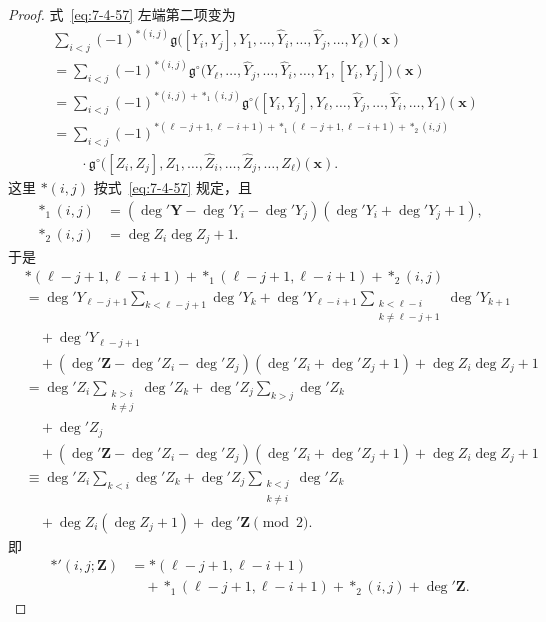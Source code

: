 \begin{proof}
式~\eqref{eq:7-4-57}
左端第二项变为
\[
\begin{aligned}
&\sum_{i<j}
(-1)^{*(i,j)}
\mathfrak g\bigl(
[Y_i,Y_j],Y_1,\ldots,
\widehat Y_i,\ldots,
\widehat Y_j,\ldots,Y_\ell
\bigr)(\mathbf x)\\
&=
\sum_{i<j}
(-1)^{*(i,j)}
\mathfrak g^{\circ}
\bigl(
Y_\ell,\ldots,
\widehat Y_j,\ldots,
\widehat Y_i,\ldots,
Y_1,[Y_i,Y_j]
\bigr)(\mathbf x)\\
&=
\sum_{i<j}
(-1)^{
*(i,j)+*_1(i,j)
}
\mathfrak g^{\circ}
\bigl(
[Y_i,Y_j],
Y_\ell,\ldots,
\widehat Y_j,\ldots,
\widehat Y_i,\ldots,Y_1
\bigr)(\mathbf x)\\
&=
\sum_{i<j}
(-1)^{
*(\ell-j+1,\ell-i+1)
+*_1(\ell-j+1,\ell-i+1)
+*_2(i,j)
}\\
&\qquad\cdot
\mathfrak g^{\circ}
\bigl(
[Z_i,Z_j],
Z_1,\ldots,
\widehat Z_i,\ldots,
\widehat Z_j,\ldots,Z_\ell
\bigr)(\mathbf x).
\end{aligned}
\]
这里
$*(i,j)$
按式~\eqref{eq:7-4-57}
规定，且
\[
\begin{aligned}
*_1(i,j)
&=
(\deg'\mathbf Y
-\deg'Y_i-\deg'Y_j)
(\deg'Y_i+\deg'Y_j+1),\\
*_2(i,j)
&=\deg Z_i\deg Z_j+1.
\end{aligned}
\]
于是
\[
\begin{aligned}
&*(\ell-j+1,\ell-i+1)
+*_1(\ell-j+1,\ell-i+1)
+*_2(i,j)\\
&=
\deg'Y_{\ell-j+1}
\sum_{k<\ell-j+1}\deg'Y_k
+\deg'Y_{\ell-i+1}
\sum_{\substack{k<\ell-i\\
k\ne\ell-j+1}}
\deg'Y_{k+1}
\\
&\quad+\deg'Y_{\ell-j+1}\\
&\quad+
(\deg'\mathbf Z-\deg'Z_i-\deg'Z_j)
(\deg'Z_i+\deg'Z_j+1)
+\deg Z_i\deg Z_j+1\\
&=
\deg'Z_i
\sum_{\substack{k>i\\k\ne j}}\deg'Z_k
+\deg'Z_j
\sum_{k>j}\deg'Z_k\\
&\quad+\deg'Z_j\\
&\quad+
(\deg'\mathbf Z-\deg'Z_i-\deg'Z_j)
(\deg'Z_i+\deg'Z_j+1)
+\deg Z_i\deg Z_j+1\\
&\equiv
\deg'Z_i
\sum_{k<i}\deg'Z_k
+\deg'Z_j
\sum_{\substack{k<j\\k\ne i}}
\deg'Z_k
\\
&\quad+\deg Z_i(\deg Z_j+1)
+\deg'\mathbf Z
\pmod2.
\end{aligned}
\]
即
\begin{equation}
\begin{aligned}
*'(i,j;\mathbf Z)
&=
*(\ell-j+1,\ell-i+1)\\
&\quad+
*_1(\ell-j+1,\ell-i+1)
+*_2(i,j)+\deg'\mathbf Z.
\end{aligned}
\tag{7.4.88}\label{eq:7-4-88}
\end{equation}


\end{proof}
